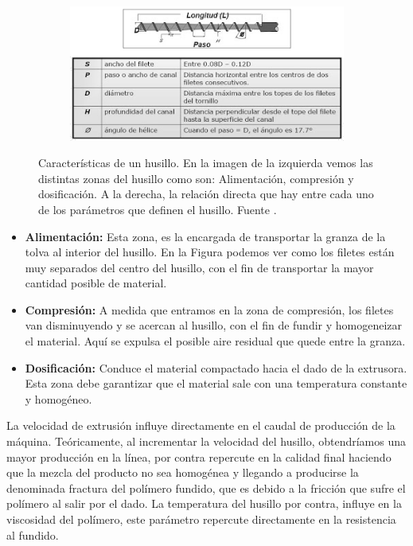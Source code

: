 \begin{itemize}
\begin{figure}[h!]
            \begin{subfigure}[b]{0.7\textwidth}
                    \centering
                \includegraphics[width=\textwidth]{images/husillo2.jpg}
                \label{fig:estado_husillo2}
            \end{subfigure}
            \caption[Características de un husillo.]{Características de un husillo. En la imagen de la izquierda vemos las distintas zonas del husillo como son: Alimentación, compresión y dosificación. A la derecha, la relación directa que hay entre cada uno de los parámetros que definen el husillo. Fuente  \cite{parametroshusillos}.}
            \label{fig:estado_husillo}
        \end{figure}
        \begin{itemize}
                \item \textbf{Alimentación:} Esta zona, es la encargada de transportar la granza de la tolva al interior del husillo. En la Figura podemos ver como los filetes están muy separados del centro del husillo, con el fin de transportar la mayor cantidad posible de material.
                \item \textbf{Compresión:} A medida que entramos en la zona de compresión, los filetes van disminuyendo y se acercan al husillo, con el fin de fundir y homogeneizar el material. Aquí se expulsa el posible aire residual que quede entre la granza.
                \item \textbf{Dosificación:} Conduce el material compactado hacia el dado de la extrusora. Esta zona debe garantizar que el material sale con una temperatura constante y homogéneo.
        \end{itemize}
\end{itemize}

La velocidad de extrusión influye directamente en el caudal de producción de la máquina. Teóricamente, al incrementar la velocidad del husillo, obtendríamos una mayor producción en la línea, por contra repercute en la calidad final haciendo que la mezcla del producto no sea homogénea y llegando a producirse la denominada fractura del polímero fundido, que es debido a la fricción que sufre el polímero al salir por el dado. La temperatura del husillo por contra, influye en la viscosidad del polímero, este parámetro repercute directamente en la resistencia al fundido.\\


